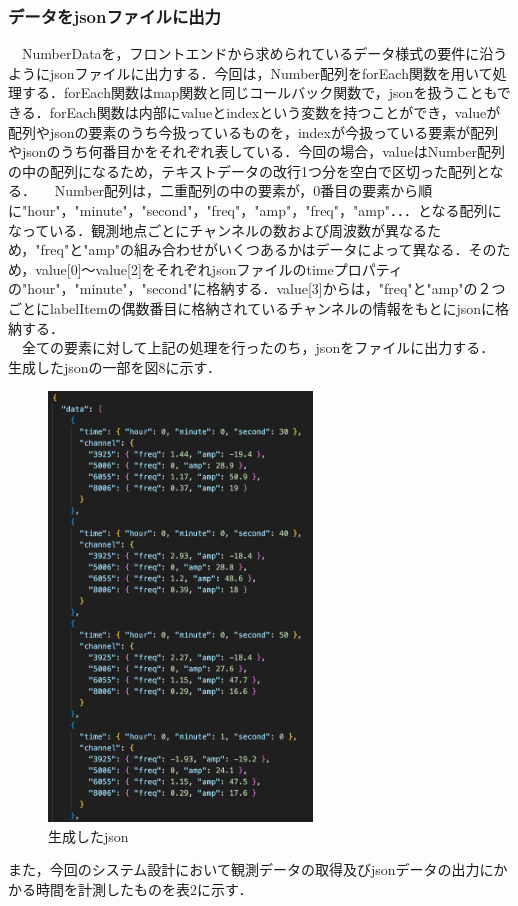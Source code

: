  \subsubsection{データをjsonファイルに出力}
　NumberDataを，フロントエンドから求められているデータ様式の要件に沿うようにjsonファイルに出力する．今回は，Number配列をforEach関数を用いて処理する．forEach関数はmap関数と同じコールバック関数で，jsonを扱うこともできる．forEach関数は内部にvalueとindexという変数を持つことができ，valueが配列やjsonの要素のうち今扱っているものを，indexが今扱っている要素が配列やjsonのうち何番目かをそれぞれ表している．今回の場合，valueはNumber配列の中の配列になるため，テキストデータの改行1つ分を空白で区切った配列となる．
　Number配列は，二重配列の中の要素が，0番目の要素から順に"hour"，"minute"，"second"，"freq"，"amp"，"freq"，"amp"．．．となる配列になっている．観測地点ごとにチャンネルの数および周波数が異なるため，"freq"と"amp"の組み合わせがいくつあるかはデータによって異なる．そのため，value[0]〜value[2]をそれぞれjsonファイルのtimeプロパティの"hour"，"minute"，"second"に格納する．value[3]からは，"freq"と"amp"の２つごとにlabelItemの偶数番目に格納されているチャンネルの情報をもとにjsonに格納する．\\
　全ての要素に対して上記の処理を行ったのち，jsonをファイルに出力する．\\
生成したjsonの一部を図8に示す．\\
\begin{figure}[ht]
  \centering
  \includegraphics[width=70mm]{fig/jsonData.png}
  \caption{生成したjson}
\end{figure}
また，今回のシステム設計において観測データの取得及びjsonデータの出力にかかる時間を計測したものを表2に示す．\cite{shu_sotsuken}\\

